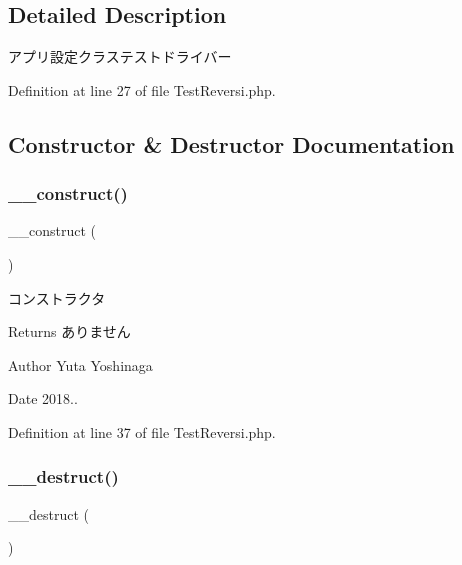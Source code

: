 \subsection{Detailed Description}
アプリ設定クラステストドライバー 

Definition at line 27 of file Test\+Reversi.\+php.



\subsection{Constructor \& Destructor Documentation}
\mbox{\label{class_test_reversi_a095c5d389db211932136b53f25f39685}} 
\subsubsection{\texorpdfstring{\+\_\+\+\_\+construct()}{\_\_construct()}}
{\footnotesize\ttfamily \+\_\+\+\_\+construct (\begin{DoxyParamCaption}{ }\end{DoxyParamCaption})}



コンストラクタ 

\begin{DoxyReturn}{Returns}
ありません 
\end{DoxyReturn}
\begin{DoxyAuthor}{Author}
Yuta Yoshinaga 
\end{DoxyAuthor}
\begin{DoxyDate}{Date}
2018.. 
\end{DoxyDate}


Definition at line 37 of file Test\+Reversi.\+php.

\mbox{\label{class_test_reversi_a421831a265621325e1fdd19aace0c758}} 
\subsubsection{\texorpdfstring{\+\_\+\+\_\+destruct()}{\_\_destruct()}}
{\footnotesize\ttfamily \+\_\+\+\_\+destruct (\begin{DoxyParamCaption}{ }\end{DoxyParamCaption})}



